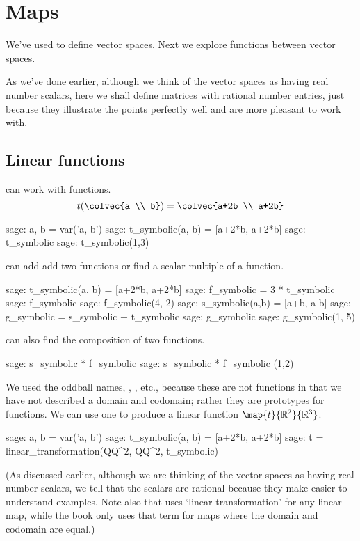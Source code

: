 \chapter{Maps}\label{chapter:maps}


We've used \Sage{} to define vector spaces.
Next we explore functions between vector spaces.

As we've done earlier, although we think of the vector spaces 
as having real number scalars, here
we shall define matrices with rational number
entries, just because they illustrate the points perfectly well
and are more pleasant to work with.
  

\section{Linear functions} \label{sec:linearfunctions}
\Sage{} can work with functions.
\begin{equation*}
  t(\colvec{a \\ b})
  =\colvec{a+2b \\ a+2b}
\end{equation*}
\begin{sagecommandline}
sage: a, b = var('a, b')   
sage: t_symbolic(a, b) = [a+2*b, a+2*b]         
sage: t_symbolic       
sage: t_symbolic(1,3)       
\end{sagecommandline}

\Sage{} can add add two functions or find a scalar multiple of a function.
\begin{sagecommandline}
sage: t_symbolic(a, b) = [a+2*b, a+2*b]         
sage: f_symbolic = 3 * t_symbolic
sage: f_symbolic
sage: f_symbolic(4, 2)
sage: s_symbolic(a,b) = [a+b, a-b]
sage: g_symbolic = s_symbolic + t_symbolic
sage: g_symbolic
sage: g_symbolic(1, 5) 
\end{sagecommandline}
\Sage{} can also find the composition of two functions.
\begin{sagecommandline}
sage: s_symbolic * f_symbolic
sage: s_symbolic * f_symbolic (1,2)
\end{sagecommandline}

We used the oddball names, 
, , etc.,
because these are not functions in that we have not described a domain
and codomain; rather they are prototypes for functions.  
We can use one to produce a linear function $\map{t}{\Re^2}{\Re^3}$.
\begin{sagecommandline} 
sage: a, b = var('a, b')   
sage: t_symbolic(a, b) = [a+2*b, a+2*b]         
sage: t = linear_transformation(QQ^2, QQ^2, t_symbolic)
\end{sagecommandline}
(As discussed earlier, although we are thinking of the vector spaces
as having real number scalars, we tell \Sage{} that
the scalars are rational because they make easier to understand examples.
Note also that \Sage{} uses `linear transformation' for any linear map,
while the book only uses that term for maps where the domain and codomain
are equal.)

